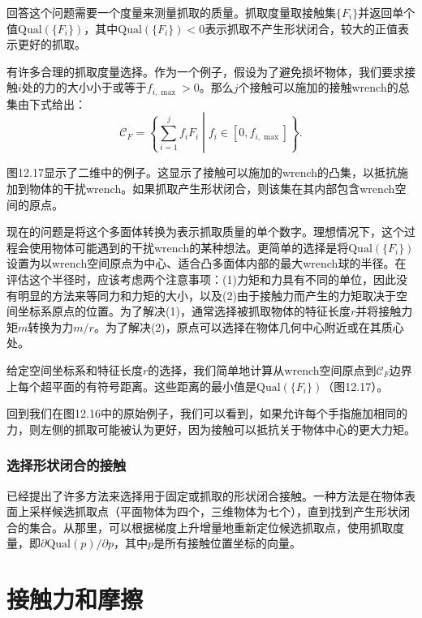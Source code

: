 \documentclass[12pt,a4paper]{article}
\begin{document}
回答这个问题需要一个度量来测量抓取的质量。抓取度量取接触集$\{F_i\}$并返回单个值$\text{Qual}(\{F_i\})$，其中$\text{Qual}(\{F_i\}) < 0$表示抓取不产生形状闭合，较大的正值表示更好的抓取。

有许多合理的抓取度量选择。作为一个例子，假设为了避免损坏物体，我们要求接触$i$处的力的大小小于或等于$f_{i,\max} > 0$。那么$j$个接触可以施加的接触wrench的总集由下式给出：
\begin{equation}
\mathcal{C}_F = \left\{\sum_{i=1}^j f_i F_i \middle| f_i \in [0, f_{i,\max}] \right\}.
\label{eq:12.15}
\end{equation}

图12.17显示了二维中的例子。这显示了接触可以施加的wrench的凸集，以抵抗施加到物体的干扰wrench。如果抓取产生形状闭合，则该集在其内部包含wrench空间的原点。

现在的问题是将这个多面体转换为表示抓取质量的单个数字。理想情况下，这个过程会使用物体可能遇到的干扰wrench的某种想法。更简单的选择是将$\text{Qual}(\{F_i\})$设置为以wrench空间原点为中心、适合凸多面体内部的最大wrench球的半径。在评估这个半径时，应该考虑两个注意事项：(1)力矩和力具有不同的单位，因此没有明显的方法来等同力和力矩的大小，以及(2)由于接触力而产生的力矩取决于空间坐标系原点的位置。为了解决(1)，通常选择被抓取物体的特征长度$r$并将接触力矩$m$转换为力$m/r$。为了解决(2)，原点可以选择在物体几何中心附近或在其质心处。

给定空间坐标系和特征长度$r$的选择，我们简单地计算从wrench空间原点到$\mathcal{C}_F$边界上每个超平面的有符号距离。这些距离的最小值是$\text{Qual}(\{F_i\})$（图12.17）。

回到我们在图12.16中的原始例子，我们可以看到，如果允许每个手指施加相同的力，则左侧的抓取可能被认为更好，因为接触可以抵抗关于物体中心的更大力矩。

\subsubsection{选择形状闭合的接触}
\label{subsubsec:choosing_contacts_form_closure}

已经提出了许多方法来选择用于固定或抓取的形状闭合接触。一种方法是在物体表面上采样候选抓取点（平面物体为四个，三维物体为七个），直到找到产生形状闭合的集合。从那里，可以根据梯度上升增量地重新定位候选抓取点，使用抓取度量，即$\partial \text{Qual}(p)/\partial p$，其中$p$是所有接触位置坐标的向量。

\section{接触力和摩擦}
\label{sec:contact_forces_friction}
\end{document}
